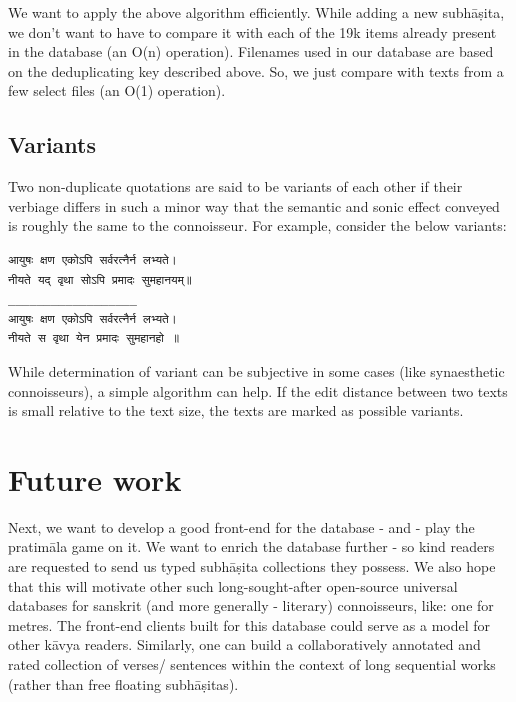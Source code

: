 \documentclass[11pt]{article}
\begin{document}
We want to apply the above algorithm efficiently. While adding a new subhāṣita, we don't want to have to compare it with each of the 19k items already present in the database (an O(n) operation). Filenames used in our database are based on the deduplicating key described above. So, we just compare with texts from a few select files (an O(1) operation).

\subsection{Variants}
Two non-duplicate quotations are said to be variants of each other if their verbiage differs in such a minor way that the semantic and sonic effect conveyed is roughly the same to the connoisseur. For example, consider the below variants:

\begin{verbatim}
आयुषः क्षण एकोऽपि सर्वरत्नैर्न लभ्यते।  
नीयते यद् वृथा सोऽपि प्रमादः सुमहानयम्॥
__________________
आयुषः क्षण एकोऽपि सर्वरत्नैर्न लभ्यते।  
नीयते स वृथा येन प्रमादः सुमहानहो ॥
\end{verbatim}

While determination of variant can be subjective in some cases (like synaesthetic connoisseurs), a simple algorithm can help. If the edit distance between two texts is small relative to the text size, the texts are marked as possible variants.

\section{Future work}
Next, we want to develop a good front-end for the database - and - play the pratimāla game on it. We want to enrich the database further - so kind readers are requested to send us typed subhāṣita collections they possess. We also hope that this will motivate other such long-sought-after open-source universal databases for sanskrit (and more generally - literary) connoisseurs, like: one for metres. The front-end clients built for this database could serve as a model for other kāvya readers. Similarly, one can build a collaboratively annotated and rated collection of verses/ sentences within the context of long sequential works (rather than free floating subhāṣitas).



\end{document}
